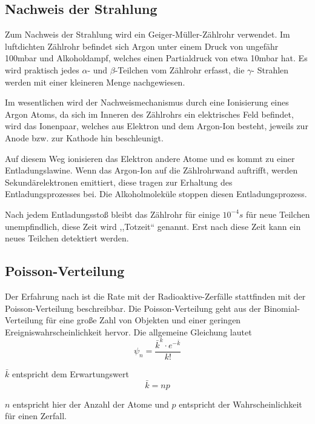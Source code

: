 \subsection{Nachweis der Strahlung}

Zum Nachweis der Strahlung wird ein Geiger-Müller-Zählrohr verwendet.
Im luftdichten Zählrohr befindet sich Argon unter einem Druck von
ungefähr 100mbar und Alkoholdampf, welches einen Partialdruck von
etwa 10mbar hat. Es wird praktisch jedes $\alpha$- und $\beta$-Teilchen
vom Zählrohr erfasst, die $\gamma$- Strahlen werden mit einer kleineren
Menge nachgewiesen.

Im wesentlichen wird der Nachweismechanismus durch eine Ionisierung
eines Argon Atoms, da sich im Inneren des Zählrohrs ein elektrisches
Feld befindet, wird das Ionenpaar, welches aus Elektron und dem Argon-Ion
besteht, jeweils zur Anode bzw. zur Kathode hin beschleunigt. 

Auf diesem Weg ionisieren das Elektron andere Atome und es kommt zu
einer Entladungslawine. Wenn das Argon-Ion auf die Zählrohrwand auftrifft,
werden Sekundärelektronen emittiert, diese tragen zur Erhaltung des
Entladungsprozesses bei. Die Alkoholmoleküle stoppen diesen Entladungsprozess.

Nach jedem Entladungsstoß bleibt das Zählrohr für einige $10^{-4}s$
für neue Teilchen unempfindlich, diese Zeit wird ,,Totzeit`` genannt.
Erst nach diese Zeit kann ein neues Teilchen detektiert werden.


\subsection{Poisson-Verteilung}

Der Erfahrung nach ist die Rate mit der Radioaktive-Zerfälle stattfinden
mit der Poisson-Verteilung beschreibbar. Die Poisson-Verteilung geht
aus der Binomial-Verteilung für eine große Zahl von Objekten und einer
geringen Ereigniswahrscheinlichkeit hervor. Die allgemeine Gleichung
lautet 
\begin{equation}
	\psi_{n}=\frac{\bar{k}^{k}\cdot e^{-\bar{k}}}{k!}\label{eq:Poisson-Verteilung allgemein}
\end{equation}


$\bar{k}$ entspricht dem Erwartungswert 
\begin{equation}
	\bar{k}=np
\end{equation}


$n$ entspricht hier der Anzahl der Atome und $p$ entspricht der
Wahrscheinlichkeit für einen Zerfall.

